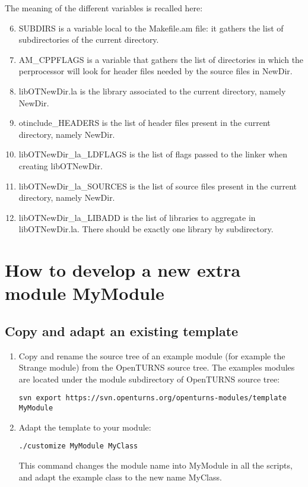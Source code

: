 \documentclass[11pt]{article}
\begin{document}
The meaning of the different variables is recalled here:
\begin{enumerate}
  \setcounter{enumi}{5}
\item SUBDIRS is a variable local to the Makefile.am file: it gathers the list of subdirectories of the current directory.
\item AM\_CPPFLAGS is a variable that gathers the list of directories in which the perprocessor will look for header files needed by the source files in NewDir.
\item libOTNewDir.la is the library associated to the current directory, namely NewDir.
\item otinclude\_HEADERS is the list of header files present in the current directory, namely NewDir.
\item libOTNewDir\_la\_LDFLAGS is the list of flags passed to the linker when creating libOTNewDir.
\item libOTNewDir\_la\_SOURCES is the list of source files present in the current directory, namely NewDir.
\item libOTNewDir\_la\_LIBADD is the list of libraries to aggregate in libOTNewDir.la. There should be exactly one library by subdirectory.
\end{enumerate}




\section{How to develop a new extra module MyModule}
\subsection{Copy and adapt an existing template}
\begin{enumerate}
\item Copy and rename the source tree of an example module (for example the Strange module) from the OpenTURNS source tree. The examples modules are located under the module subdirectory of OpenTURNS source tree:
\begin{verbatim}
svn export https://svn.openturns.org/openturns-modules/template MyModule
\end{verbatim}
\item Adapt the template to your module:
\begin{verbatim}
./customize MyModule MyClass
\end{verbatim}
  This command changes the module name into MyModule in all the scripts, and adapt the example class to the new name MyClass.
\end{enumerate}
\end{document}
